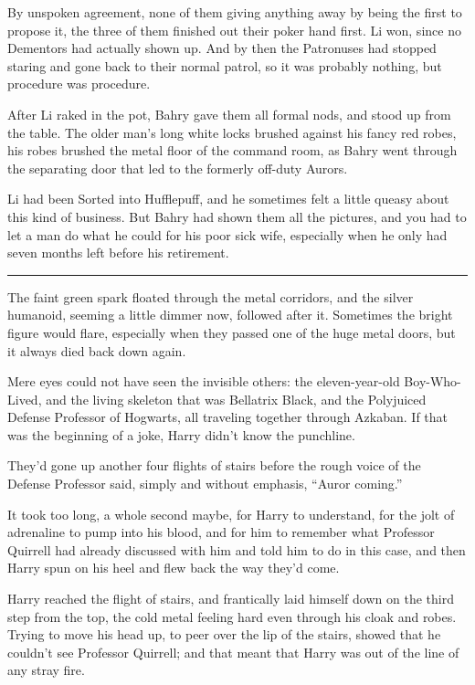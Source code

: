 By unspoken agreement, none of them giving anything away by being the
first to propose it, the three of them finished out their poker hand
first. Li won, since no Dementors had actually shown up. And by then the
Patronuses had stopped staring and gone back to their normal patrol, so
it was probably nothing, but procedure was procedure.

After Li raked in the pot, Bahry gave them all formal nods, and stood up
from the table. The older man's long white locks brushed against his
fancy red robes, his robes brushed the metal floor of the command room,
as Bahry went through the separating door that led to the formerly
off-duty Aurors.

Li had been Sorted into Hufflepuff, and he sometimes felt a little
queasy about this kind of business. But Bahry had shown them all the
pictures, and you had to let a man do what he could for his poor sick
wife, especially when he only had seven months left before his
retirement.

\begin{center}\rule{3in}{0.4pt}\end{center}

The faint green spark floated through the metal corridors, and the
silver humanoid, seeming a little dimmer now, followed after it.
Sometimes the bright figure would flare, especially when they passed one
of the huge metal doors, but it always died back down again.

Mere eyes could not have seen the invisible others: the eleven-year-old
Boy-Who-Lived, and the living skeleton that was Bellatrix Black, and the
Polyjuiced Defense Professor of Hogwarts, all traveling together through
Azkaban. If that was the beginning of a joke, Harry didn't know the
punchline.

They'd gone up another four flights of stairs before the rough voice of
the Defense Professor said, simply and without emphasis, ``Auror
coming.''

It took too long, a whole second maybe, for Harry to understand, for the
jolt of adrenaline to pump into his blood, and for him to remember what
Professor Quirrell had already discussed with him and told him to do in
this case, and then Harry spun on his heel and flew back the way they'd
come.

Harry reached the flight of stairs, and frantically laid himself down on
the third step from the top, the cold metal feeling hard even through
his cloak and robes. Trying to move his head up, to peer over the lip of
the stairs, showed that he couldn't see Professor Quirrell; and that
meant that Harry was out of the line of any stray fire.

